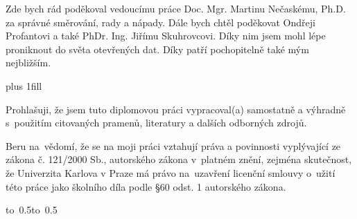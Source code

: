 \documentclass[12pt,a4paper]{report}
\let\openright=\clearpage
\begin{document}
\newpage



\openright

\noindent
Zde bych rád poděkoval vedoucímu práce Doc. Mgr. Martinu Nečaskému, Ph.D. za správné směrování, rady a nápady. Dále bych chtěl poděkovat Ondřeji Profantovi a také PhDr. Ing. Jiřímu Skuhrovcovi. Díky nim jsem mohl lépe proniknout do světa otevřených dat. Díky patří pochopitelně také mým nejbližším. 

\newpage


\vglue 0pt plus 1fill

\noindent
Prohlašuji, že jsem tuto diplomovou práci vypracoval(a) samostatně a výhradně
s~použitím citovaných pramenů, literatury a dalších odborných zdrojů.

\medskip\noindent
Beru na~vědomí, že se na moji práci vztahují práva a povinnosti vyplývající
ze zákona č. 121/2000 Sb., autorského zákona v~platném znění, zejména skutečnost,
že Univerzita Karlova v Praze má právo na~uzavření licenční smlouvy o~užití této
práce jako školního díla podle §60 odst. 1 autorského zákona.

\vspace{10mm}

\hbox{\hbox to 0.5\hbox to 0.5}

\vspace{20mm}
\newpage

\end{document}
